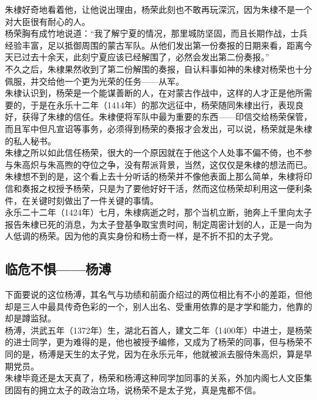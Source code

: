 \begin{multicols}{\theparacolNo}
朱棣好奇地看着他，让他说出理由，杨荣此刻也不敢再玩深沉，因为朱棣不是一个对大臣很有耐心的人。\\

杨荣胸有成竹地说道：“我了解宁夏的情况，那里城防坚固，而且长期作战，士兵经验丰富，足以抵御周围的蒙古军队。从他们发出第一份奏报的日期来看，距离今天已过去十余天，此刻宁夏应该已经解围了，必然会发出第二份奏报。”\\

不久之后，朱棣果然收到了第二份解围的奏报，自认料事如神的朱棣对杨荣也十分佩服，并交给他一个更为光荣的任务——从军。\\

朱棣认识到，杨荣是一个能谋善断的人，在对蒙古作战中，这样的人才正是他所需要的，于是在永乐十二年（1414年）的那次远征中，杨荣随同朱棣出行，表现良好，获得了朱棣的信任。朱棣便将军队中最为重要的东西——印信交给杨荣保管，而且军中但凡宣诏等事务，必须得到杨荣的奏报才会发出，可以说，杨荣就是朱棣的私人秘书。\\

朱棣之所以如此信任杨荣，很大的一个原因就在于他这个人处事不偏不倚，也不参与朱高炽与朱高煦的夺位之争，没有帮派背景，当然，这仅仅是朱棣的想法而已。\\

朱棣想不到的是，这个看上去十分听话的杨荣并不像他表面上那么简单，朱棣将印信和奏报之权授予杨荣，只是为了要他好好干活，然而这位杨荣却利用这一便利条件，在关键时刻做出了一件关键的事情。\\

永乐二十二年（1424年）七月，朱棣病逝之时，那个当机立断，驰奔上千里向太子报告朱棣已死的消息，为太子登基争取宝贵时间，制定周密计划的人，正是一向为人低调的杨荣。因为他的真实身份和杨士奇一样，是不折不扣的太子党。\\

\subsection{临危不惧——杨溥}
下面要说的这位杨溥，其名气与功绩和前面介绍过的两位相比有不小的差距，但他却是三人中最具传奇色彩的一个，别人出名、受重用依靠的是才学和能力，他靠的却是蹲监狱。\\

杨溥，洪武五年（1372年）生，湖北石首人，建文二年（1400年）中进士，是杨荣的进士同学，更为难得的是，他也被授予编修，又成为了杨荣的同事，但与杨荣不同的是，杨溥是天生的太子党，因为在永乐元年，他就被派去服侍朱高炽，算是早期党员。\\

朱棣毕竟还是太天真了，杨荣和杨溥这种同学加同事的关系，外加内阁七人文臣集团固有的拥立太子的政治立场，说杨荣不是太子党，真是鬼都不信。\\


\end{multicols}
